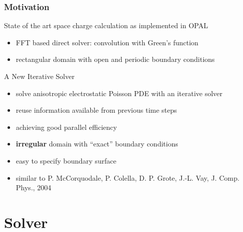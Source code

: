 \documentclass[xcolor=pdftex,table,10pt]{beamer}
\newcommand{\opal}{\textsc{OPAL }}
\begin{document}
	\begin{frame}
		\frametitle{Motivation}

		\begin{exampleblock}{State of the art space charge calculation as implemented in \opal}
		\begin{itemize}
			\item FFT based direct solver: convolution with Green's function
			\item rectangular domain with open and periodic boundary conditions
		\end{itemize}
		\end{exampleblock}
		\vspace{0.5cm}

		\begin{alertblock}{A New Iterative Solver}
		\begin{itemize}
			\item solve anisotropic electrostatic Poisson PDE with an iterative solver
            \item reuse information available from previous time steps
            \item achieving good parallel efficiency
			\item \alert{\textbf{irregular}} domain with ``exact'' boundary conditions
            \item easy to specify boundary surface
            \item similar to P. McCorquodale, P. Colella, D. P. Grote, J.-L. Vay, J. Comp. Phys., 2004
		\end{itemize}
		\end{alertblock}

	\end{frame}
	
    \section{Solver}
\end{document}
